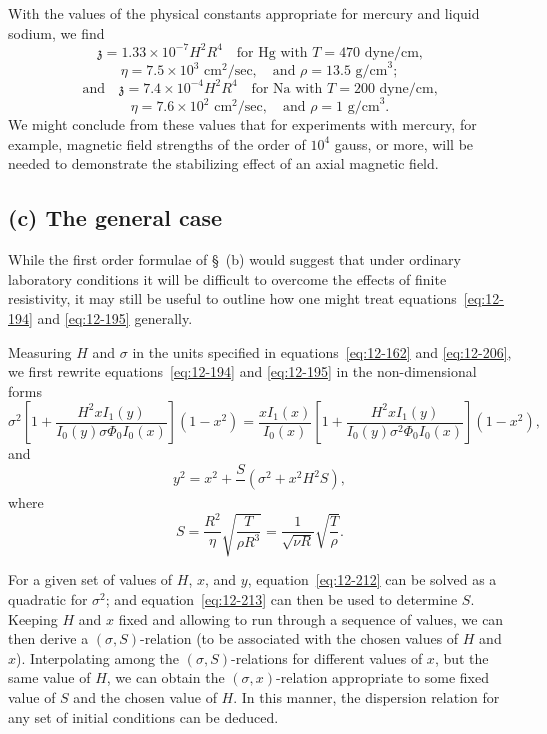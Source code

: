 With the values of the physical constants appropriate for mercury and liquid sodium, we find
\begin{equation}
\label{eq:12-210}
\mathfrak{z} = 1.33 \times 10^{-7}H^2R^4 \quad \text{for Hg with } T = 470 \text{ dyne/cm,}
\end{equation}
\[
\eta = 7.5 \times 10^3 \text{ cm}^2/\text{sec}, \quad \text{and } \rho = 13.5 \text{ g/cm}^3;
\]
\begin{equation}
\label{eq:12-211}
\text{and} \quad \mathfrak{z} = 7.4 \times 10^{-4}H^2R^4 \quad \text{for Na with } T = 200 \text{ dyne/cm,}
\end{equation}
\[
\eta = 7.6 \times 10^2 \text{ cm}^2/\text{sec}, \quad \text{and } \rho = 1 \text{ g/cm}^3.
\]
We might conclude from these values that for experiments with mercury, for example, magnetic field strengths of the order of $10^4$ gauss, or more, will be needed to demonstrate the stabilizing effect of an axial magnetic field.

\subsection*{(c) The general case}

While the first order formulae of \S~(b) would suggest that under ordinary laboratory conditions it will be difficult to overcome the effects of finite resistivity, it may still be useful to outline how one might treat equations~\eqref{eq:12-194} and \eqref{eq:12-195} generally.

Measuring $H$ and $\sigma$ in the units specified in equations~\eqref{eq:12-162} and \eqref{eq:12-206}, we first rewrite equations~\eqref{eq:12-194} and \eqref{eq:12-195} in the non-dimensional forms
\begin{equation}
\label{eq:12-212}
\sigma^2\left[1 + \frac{H^2 xI_1(y)}{I_0(y)\sigma\Phi_0 I_0(x)}\right](1-x^2) = \frac{xI_1(x)}{I_0(x)}\left[1 + \frac{H^2 x I_1(y)}{I_0(y)\sigma^2 \Phi_0 I_0(x)}\right](1-x^2),
\end{equation}
and
\begin{equation}
\label{eq:12-213}
y^2 = x^2 + \frac{S}{} (\sigma^2 + x^2 H^2 S),
\end{equation}
where
\begin{equation}
\label{eq:12-214}
S = \frac{R^2}{\eta}\sqrt{\frac{T}{\rho R^3}} = \frac{1}{\sqrt{\nu R}}\sqrt{\frac{T}{\rho}}.
\end{equation}

For a given set of values of $H$, $x$, and $y$, equation~\eqref{eq:12-212} can be solved as a quadratic for $\sigma^2$; and equation~\eqref{eq:12-213} can then be used to determine $S$. Keeping $H$ and $x$ fixed and allowing to run through a sequence of values, we can then derive a $(\sigma, S)$-relation (to be associated with the chosen values of $H$ and $x$). Interpolating among the $(\sigma, S)$-relations for different values of $x$, but the same value of $H$, we can obtain the $(\sigma, x)$-relation appropriate to some fixed value of $S$ and the chosen value of $H$. In this manner, the dispersion relation for any set of initial conditions can be deduced.

